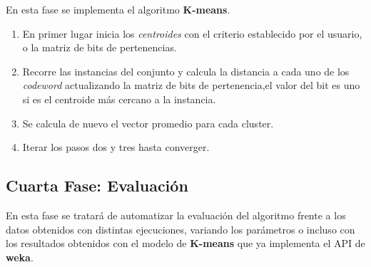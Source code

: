 \documentclass[10pt,a4paper]{article}
\begin{document}
En esta fase se implementa el algoritmo \textbf{K-means}.
\begin{enumerate}
	\item En primer lugar inicia los \textit{centroides} con el criterio establecido por el usuario, o la matriz de bits de pertenencias.
	\item Recorre las instancias del conjunto y calcula la distancia a cada uno de los \textit{codeword} actualizando la matriz de bits de pertenencia,el valor 		del bit es uno si es el centroide más cercano a la instancia.
	\item Se calcula de nuevo el vector promedio para cada cluster.
	\item Iterar los pasos dos y tres hasta converger.
\end{enumerate}

\subsection*{Cuarta Fase: Evaluación}

En esta fase se tratará de automatizar la evaluación del algoritmo frente a los datos obtenidos con distintas ejecuciones, variando los parámetros o incluso con  
los resultados obtenidos con el modelo de \textbf{K-means} que ya implementa el API de \textbf{weka}.
\end{document}
